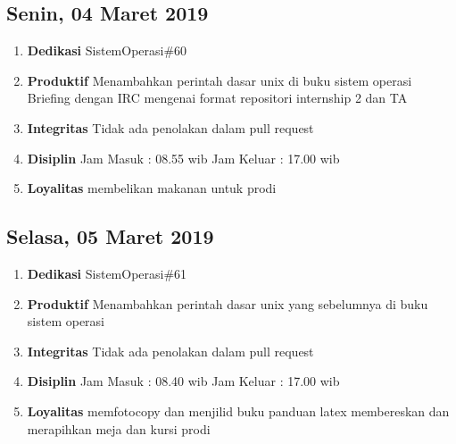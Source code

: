 \subsection{Senin, 04 Maret 2019}
\begin{enumerate}
\item \textbf{Dedikasi}
\subitem SistemOperasi\#60
\item \textbf{Produktif}
\subitem Menambahkan perintah dasar unix di buku sistem operasi
\subitem Briefing dengan IRC mengenai format repositori internship 2 dan TA
\item \textbf{Integritas}
\subitem Tidak ada penolakan dalam pull request
\item \textbf{Disiplin}
\subitem Jam Masuk : 08.55 wib
\subitem Jam Keluar : 17.00 wib
\item \textbf{Loyalitas}
\subitem membelikan makanan untuk prodi 
\end{enumerate}

\subsection{Selasa, 05 Maret 2019}
\begin{enumerate}
\item \textbf{Dedikasi}
\subitem SistemOperasi\#61
\item \textbf{Produktif}
\subitem Menambahkan perintah dasar unix yang sebelumnya di buku sistem operasi
\item \textbf{Integritas}
\subitem Tidak ada penolakan dalam pull request
\item \textbf{Disiplin}
\subitem Jam Masuk : 08.40 wib
\subitem Jam Keluar : 17.00 wib
\item \textbf{Loyalitas}
\subitem memfotocopy dan menjilid buku panduan latex
\subitem membereskan dan merapihkan meja dan kursi prodi
\end{enumerate}
